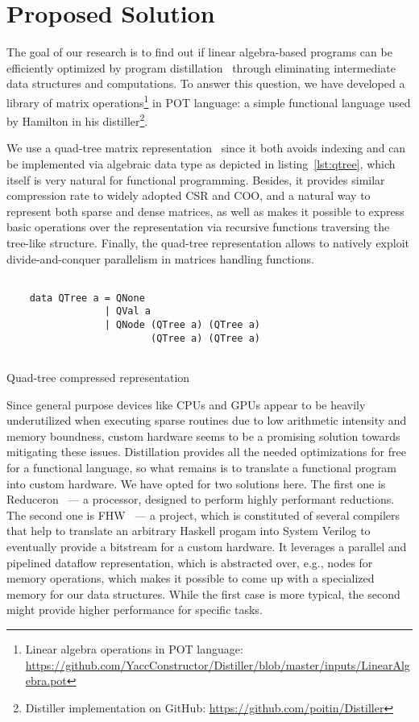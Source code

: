 \section{Proposed Solution}

The goal of our research is to find out if linear algebra-based programs can be efficiently optimized by program distillation~\cite{hamilton2021700} through eliminating intermediate data structures and computations.
To answer this question, we have developed a library of matrix operations\footnote{Linear algebra operations in POT language: \url{https://github.com/YaccConstructor/Distiller/blob/master/inputs/LinearAlgebra.pot}} in POT language: a simple functional language used by Hamilton in his distiller\footnote{Distiller implementation on GitHub: \url{https://github.com/poitin/Distiller}}.  

We use a quad-tree matrix representation~\cite{qtree} since it both avoids indexing and can be implemented via algebraic data type as depicted in listing~\ref{lst:qtree}, which itself is very natural for functional programming.
Besides, it provides similar compression rate to widely adopted CSR and COO, and a natural way to represent both sparse and dense matrices, as well as makes it possible to express basic operations over the representation via recursive functions traversing the tree-like structure.
Finally, the quad-tree representation allows to natively exploit divide-and-conquer parallelism in matrices handling functions.

\begin{listing}

    \begin{verbatim}
  
    data QTree a = QNone  
                 | QVal a 
                 | QNode (QTree a) (QTree a)
                         (QTree a) (QTree a) 
    
    \end{verbatim}
    \caption{Quad-tree compressed representation}
    \label{lst:qtree}
    
    \end{listing}

Since general purpose devices like CPUs and GPUs appear to be heavily underutilized when executing sparse routines due to low arithmetic intensity and memory boundness, custom hardware seems to be a promising solution towards mitigating these issues. 
Distillation provides all the needed optimizations for free for a functional language, so what remains is to translate a functional program into custom hardware. We have opted for two solutions here.
The first one is Reduceron~\cite{naylorRunciman2012} --- a processor, designed to perform highly performant reductions.
The second one is FHW~\cite{Edwards2019FHWP} --- a project, which is constituted of several compilers that help to translate an arbitrary Haskell progam into System Verilog to eventually provide a bitstream for a custom hardware.
It leverages a parallel and pipelined dataflow representation, which is abstracted over, e.g., nodes for memory operations, which makes it possible to come up with a specialized memory for our data structures.
While the first case is more typical, the second might provide higher performance for specific tasks.

